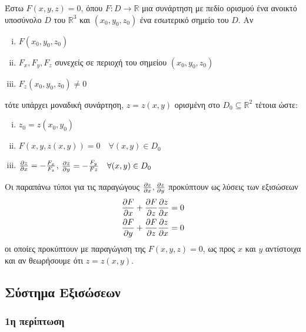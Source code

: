 Έστω $ F(x,y,z) = 0 $, όπου $F\colon D \to \mathbb{R}$ μια συνάρτηση με πεδίο ορισμού ένα ανοικτό
υποσύνολο $ D $ του $ \mathbb{R}^{3}  $ και $ (x_0,y_0,z_0) $ ένα εσωτερικό σημείο του $ D $. Αν
\begin{enumerate}[(i)]
	\item $ F(x_0,y_0,z_0) $
	\item $ F_x, F_y, F_z $ συνεχείς σε περιοχή του σημείου $ (x_0,y_0,z_0) $
	\item $ F_z(x_0,y_0,z_0) \neq 0 $
\end{enumerate}
τότε υπάρχει μοναδική συνάρτηση, $ z=z(x,y) $ ορισμένη στο $ D_0 \subseteq \mathbb{R}^{2} $ τέτοια
ώστε:
\begin{enumerate}[(i)]
	\item $ z_0 = z(x_0,y_0) $
	\item $ F(x,y,z(x,y)) = 0  \quad \forall (x,y)\in  D_0 $
	\item $ \pdv{z}{x} = - \frac{F_x}{F_z} $, $ \pdv{z}{y} = - \frac{F_y}{Fz}\quad \forall (x,y) \in
		D_0$
\end{enumerate}

\begin{rem}
	Οι παραπάνω τύποι για τις παραγώγους $ \pdv{z}{x}, \pdv{z}{y} $ προκύπτουν ως λύσεις των 
	εξισώσεων  
	\begin{align*}	
	\pdv{F}{x} + \pdv{F}{z}\pdv{z}{x} &= 0 \\
	\pdv{F}{y} + \pdv{F}{z}\pdv{z}{x} &= 0 
\end{align*}
	οι οποίες προκύπτουν με παραγώγιση της $ F(x,y,z) = 0 $, ως προς $x$ και $y$ αντίστοιχα και  αν θεωρήσουμε ότι $ z=z(x,y) $.
	
\end{rem}

\subsection{Σύστημα Εξισώσεων}

\subsubsection{1η περίπτωση}

